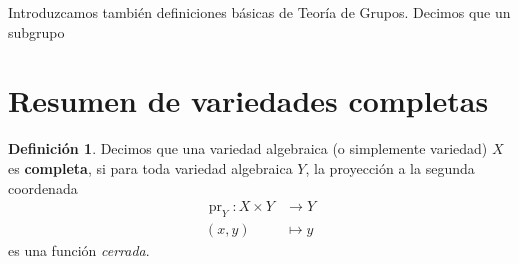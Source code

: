 \documentclass[spanish,10pt]{amsart}
\theoremstyle{definition}
\newtheorem{definition}[theorem]{Definición}
\theoremstyle{remark}
\numberwithin{equation}{section}
\begin{document}
Introduzcamos también definiciones básicas de Teoría de Grupos. Decimos que un subgrupo




\section{Resumen de variedades completas}

\begin{definition}
Decimos que una variedad algebraica (o simplemente variedad) $X$ es \textbf{completa}, si para toda variedad algebraica $Y$, la proyección a la segunda coordenada
\begin{align*}
\operatorname{pr}_Y : X \times Y &\longrightarrow Y \\
(x,y) &\longmapsto y
\end{align*}
es una función \textit{cerrada}.
\end{definition}
\end{document}
